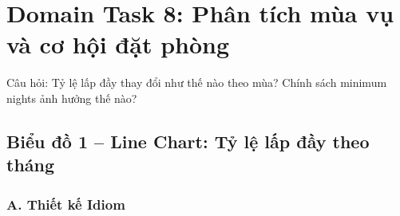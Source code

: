 \section{Domain Task 8: Phân tích mùa vụ và cơ hội đặt phòng}

Câu hỏi: Tỷ lệ lấp đầy thay đổi như thế nào theo mùa? Chính sách minimum
nights ảnh hưởng thế nào?

\subsection{Biểu đồ 1 -- Line Chart: Tỷ lệ lấp đầy theo tháng}

\subsubsection*{A. Thiết kế Idiom}

